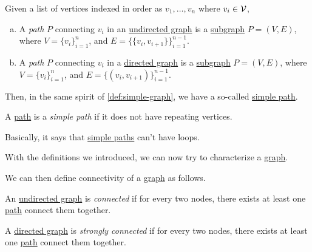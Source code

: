 \begin{definition}[Path]\label{def:path}
	Given a list of vertices indexed in order as \(v_1, \ldots , v_n\) where \(v_i\in \mathcal{\MakeUppercase{v}} \),
	\begin{enumerate}[(a)]
		\item A \emph{path} \(P\) connecting \(v_i\) in an \hyperref[def:undirected-graph]{undirected graph} is a \hyperref[def:subgraph]{subgraph} \(P = (V, E)\), where \(V=\{v_i\}_{i=1}^n\), and \(E = \{\{v_i, v_{i+1}\}\}_{i = 1}^{n-1}\).
		\item A \emph{path} \(P\) connecting \(v_i\) in a \hyperref[def:directed-graph]{directed graph} is a \hyperref[def:subgraph]{subgraph} \(P = (V, E)\), where \(V=\{v_i\}_{i=1}^n\), and \(E = \{(v_i, v_{i+1})\}_{i = 1}^{n-1}\).
	\end{enumerate}
\end{definition}

Then, in the same spirit of \autoref{def:simple-graph}, we have a so-called \hyperref[def:simple-path]{simple path}.
\begin{definition}\label{def:simple-path}
	A \hyperref[def:path]{path} is a \emph{simple path} if it does not have repeating vertices.
\end{definition}
\begin{intuition}
	Basically, it says that \hyperref[def:simple-path]{simple paths} can't have loops.
\end{intuition}

With the definitions we introduced, we can now try to characterize a \hyperref[def:graph]{graph}.

\begin{definition*}
	We can then define connectivity of a \hyperref[def:graph]{graph} as follows.
	\begin{definition}[Connected]\label{def:connected}
		An \hyperref[def:undirected-graph]{undirected graph} is \emph{connected} if for every two nodes, there exists at least one \hyperref[def:path]{path} connect them together.
	\end{definition}

	\begin{definition}\label{def:strongly-connected}
		A \hyperref[def:directed-graph]{directed graph} is \emph{strongly connected} if for every two nodes, there exists at least one \hyperref[def:path]{path} connect them together.
	\end{definition}
\end{definition*}

